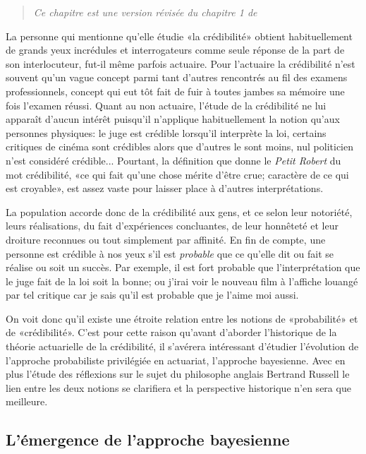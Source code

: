 \vspace*{-1.5\baselineskip}
\begin{quote}
  \itshape Ce chapitre est une version révisée du chapitre 1 de
  \cite{Goulet:masters}
\end{quote}

La personne qui mentionne qu'elle étudie «la crédibilité» obtient
habituellement de grands yeux incrédules et interrogateurs comme seule
réponse de la part de son interlocuteur, fut-il même parfois actuaire.
Pour l'actuaire la crédibilité n'est souvent qu'un vague concept parmi
tant d'autres rencontrés au fil des examens professionnels, concept
qui eut tôt fait de fuir à toutes jambes sa mémoire une fois l'examen
réussi. Quant au non actuaire, l'étude de la crédibilité ne lui
apparaît d'aucun intérêt puisqu'il n'applique habituellement la notion
qu'aux personnes physiques: le juge est crédible lorsqu'il interprète
la loi, certains critiques de cinéma sont crédibles alors que d'autres
le sont moins, nul politicien n'est considéré crédible... Pourtant, la
définition que donne le \emph{Petit Robert} du mot crédibilité, «ce
qui fait qu'une chose mérite d'être crue; caractère de ce qui est
croyable», est assez vaste pour laisser place à d'autres
interprétations.

La population accorde donc de la crédibilité aux gens, et ce selon
leur notoriété, leurs réalisations, du fait d'expériences concluantes,
de leur honnêteté et leur droiture reconnues ou tout simplement par
affinité. En fin de compte, une personne est crédible à nos yeux s'il
est \emph{probable} que ce qu'elle dit ou fait se réalise ou soit un
succès. Par exemple, il est fort probable que l'interprétation que le
juge fait de la loi soit la bonne; ou j'irai voir le nouveau film à
l'affiche louangé par tel critique car je sais qu'il est probable que
je l'aime moi aussi.

On voit donc qu'il existe une étroite relation entre les notions de
«probabilité» et de «crédibilité». C'est pour cette raison qu'avant
d'aborder l'historique de la théorie actuarielle de la crédibilité, il
s'avérera intéressant d'étudier l'évolution de l'approche probabiliste
privilégiée en actuariat, l'approche bayesienne. Avec en plus l'étude
des réflexions sur le sujet du philosophe anglais Bertrand Russell le
lien entre les deux notions se clarifiera et la perspective historique
n'en sera que meilleure.

\subsection{L'émergence de l'approche bayesienne}


